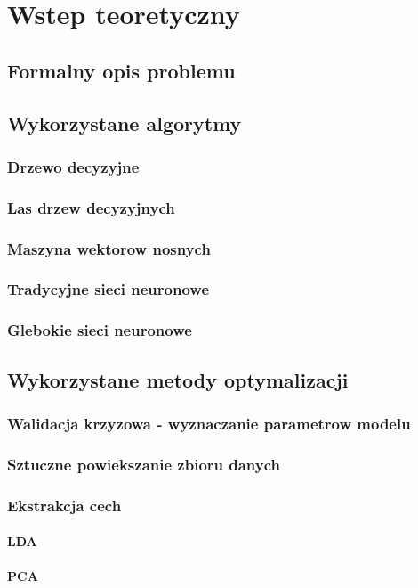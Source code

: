 \section{Wstep teoretyczny}
\subsection{Formalny opis problemu}
\subsection{Wykorzystane algorytmy}
\subsubsection{Drzewo decyzyjne}
\subsubsection{Las drzew decyzyjnych}
\subsubsection{Maszyna wektorow nosnych}
\subsubsection{Tradycyjne sieci neuronowe}
\subsubsection{Glebokie sieci neuronowe}
\subsection{Wykorzystane metody optymalizacji}
\subsubsection{Walidacja krzyzowa - wyznaczanie parametrow modelu}
\subsubsection{Sztuczne powiekszanie zbioru danych}
\subsubsection{Ekstrakcja cech}
\paragraph{LDA}
\paragraph{PCA}

